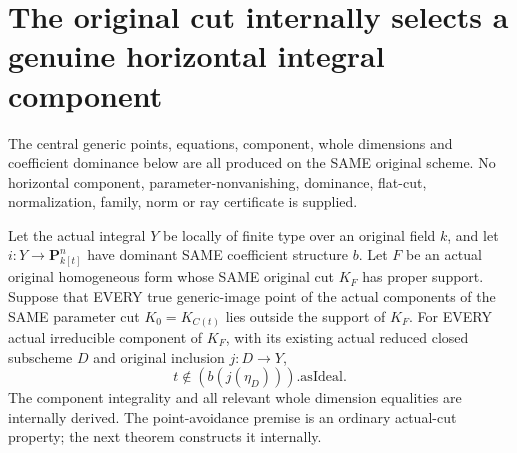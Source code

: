 \section{The original cut internally selects a genuine horizontal integral component}
The central generic points, equations, component, whole dimensions and
coefficient dominance below are all produced on the SAME original scheme.
No horizontal component, parameter-nonvanishing, dominance, flat-cut,
normalization, family, norm or ray certificate is supplied.

\begin{theorem}
\label{thm:pl-gauss-original-cut-component-parameter-nonvanishing}
\leanok
Let the actual integral $Y$ be locally of finite type over an original
field $k$, and let $i:Y\to\mathbf P^n_{k[t]}$ have dominant SAME
coefficient structure $b$. Let $F$ be an actual original homogeneous
form whose SAME original cut $K_F$ has proper support. Suppose that
EVERY true generic-image point of the actual components of the SAME
parameter cut $K_0=K_{C(t)}$ lies outside the support of $K_F$.
For EVERY actual irreducible component of $K_F$, with its existing
actual reduced closed subscheme $D$ and original inclusion $j:D\to Y$,
\[
 t\notin (b(j(\eta_D))).\mathrm{asIdeal}.
\]
The component integrality and all relevant whole dimension equalities
are internally derived. The point-avoidance premise is an ordinary
actual-cut property; the next theorem constructs it internally.
\end{theorem}
